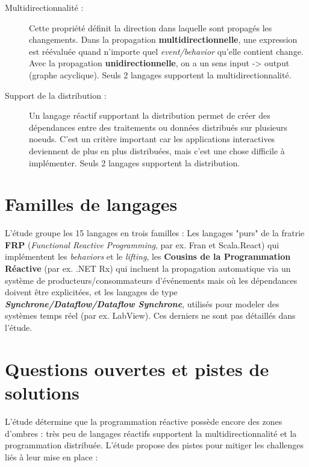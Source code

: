 \documentclass[10pt,final]{IEEEtran}
\begin{document}
\begin{description}
    \item[Multidirectionnalité :]
    Cette propriété définit la direction dans laquelle sont propagés les changements. Dans la propagation \textbf{multidirectionnelle}, une expression est réévaluée quand n'importe quel \textit{event/behavior} qu'elle contient change. Avec la propagation \textbf{unidirectionnelle}, on a un sens input -> output (graphe acyclique). Seuls 2 langages supportent la multidirectionnalité.
    
    \item[Support de la distribution :]
    Un langage réactif supportant la distribution permet de créer des dépendances entre des traitements ou données distribués sur plusieurs noeuds. C'est un critère important car les applications interactives deviennent de plus en plus distribuées, mais c'est une chose difficile à implémenter. Seuls 2 langages supportent la distribution.
\end{description}


\section{Familles de langages}

L'étude groupe les 15 langages en trois familles : Les langages "purs" de la fratrie \textbf{FRP} (\textit{Functional Reactive Programming}, par ex. Fran et Scala.React) qui implémentent les \textit{behaviors} et le \textit{lifting}, les \textbf{Cousins de la Programmation Réactive} (par ex. .NET Rx) qui incluent la propagation automatique via un système de producteurs/consommateurs d'événements mais où les dépendances doivent être explicitées, et les langages de type \textit{\textbf{Synchrone/Dataflow/Dataflow Synchrone}}, utilisés pour modeler des systèmes temps réel (par ex. LabView). Ces derniers ne sont pas détaillés dans l'étude.

\section{Questions ouvertes et pistes de solutions}
 
L'étude détermine que la programmation réactive possède encore des zones d'ombres : très peu de langages réactifs supportent la multidirectionnalité et la programmation distribuée. L'étude propose des pistes pour mitiger les challenges liés à leur mise en place :
\end{document}
